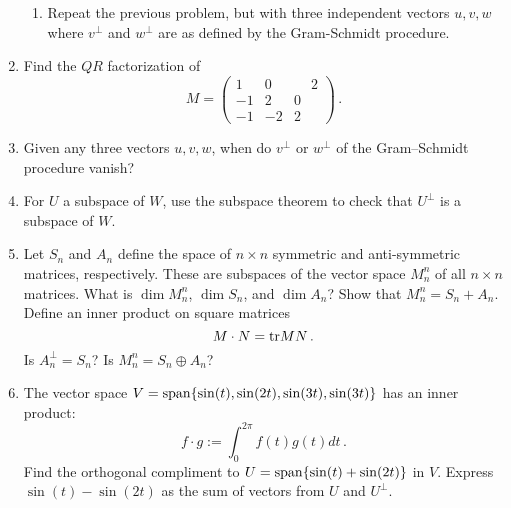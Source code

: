 \begin{enumerate}
\begin{enumerate}
\item Repeat the previous problem, but with three independent vectors $u,v,w$
 where $v^\perp$ and $w^\perp$ are as defined by the Gram-Schmidt procedure. 
\end{enumerate}



\item \label{QRprob} Find the $QR$ factorization of
\[
M=\begin{pmatrix}1&0&\phantom{\!-}2\\-1&2&0\\-1&-2&2
\end{pmatrix}\, .
\]


\item Given any three vectors $u,v,w$, when do $v^\perp$ or $w^\perp$ of the Gram--Schmidt procedure vanish?


\item For $U$ a subspace of $W$, use the subspace theorem to check that $U^\perp$ is a subspace of $W$.




\item %
Let $S_n$ and $A_n$ define the space of $n \times n$ symmetric and anti-symmetric matrices, respectively. These are subspaces of the vector space $M^n_n$ of all $n\times n$ matrices. What is $\dim M^n_n$, $\dim S_n$, and $\dim A_n$? Show that $M^n_n = S_n + A_n$. Define an inner product on square matrices
\[
M\cdot N ={\rm tr} MN\, .
\]
Is $A_n^{\perp}=S_n$? Is $M^n_n = S_n \oplus A_n$?


\item The vector space $V={\rm span} \{ \sin(t),\sin(2t), \sin(3t) , \sin(3t)\}$ has an inner product: 
\[f\cdot g:=\int _0^{2\pi}f(t)g(t) dt\, .\] Find the orthogonal compliment to $U={\rm span} \{ \sin(t)+\sin(2t) \}$ in $V$. Express $\sin(t)-\sin(2t)$ as  the sum of vectors from $U$ and $U^\perp$.

\end{enumerate}

